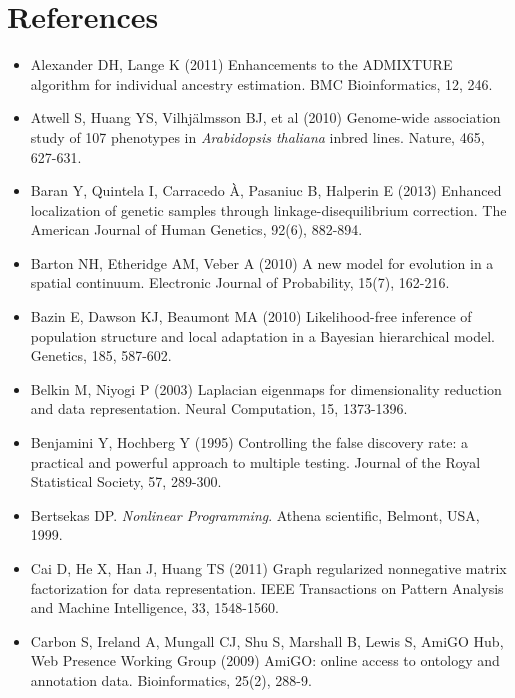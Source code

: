 \clearpage
\newpage


\section*{References}

\begin{itemize}


\item[] Alexander DH, Lange K (2011) Enhancements to the ADMIXTURE algorithm for individual ancestry estimation. BMC Bioinformatics, 12, 246.

\item[] Atwell S, Huang YS, Vilhj\"almsson BJ, et al (2010) Genome-wide association study of 107 phenotypes in {\it Arabidopsis thaliana} inbred lines. Nature, 465, 627-631.

\item[] Baran Y, Quintela I, Carracedo \`A, Pasaniuc B, Halperin E (2013) Enhanced localization of genetic samples through linkage-disequilibrium correction. The American Journal of Human Genetics, 92(6), 882-894.

\item[] Barton NH, Etheridge AM,  V\’eber A (2010) A new model for evolution in a spatial continuum. Electronic Journal of Probability, 15(7), 162-216.

\item[] Bazin E, Dawson KJ, Beaumont MA (2010) Likelihood-free inference of population structure and local adaptation in a Bayesian hierarchical model. Genetics, 185, 587-602.

\item[] Belkin M, Niyogi P (2003) Laplacian eigenmaps for dimensionality reduction and data representation. Neural Computation, 15, 1373-1396.

\item[] Benjamini Y, Hochberg Y (1995) Controlling the false discovery rate: a practical and powerful approach to multiple testing. Journal of the Royal Statistical Society, 57, 289-300.

\item[] Bertsekas DP. {\it Nonlinear Programming}. Athena scientific, Belmont, USA, 1999.

\item[] Cai D, He X, Han J, Huang TS (2011) Graph regularized nonnegative matrix factorization for data representation. IEEE Transactions on Pattern Analysis and Machine Intelligence, 33, 1548-1560.

\item[] Carbon S, Ireland A, Mungall CJ, Shu S, Marshall B, Lewis S, AmiGO Hub, Web Presence Working Group (2009) AmiGO: online access to ontology and annotation data. Bioinformatics, 25(2), 288-9.


\end{itemize}
